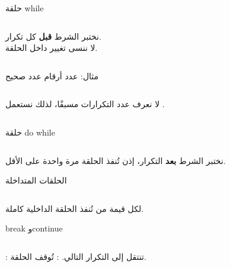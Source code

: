 \documentclass[aspectratio=169, 11pt, t, xcolor={table}]{beamer}
\begin{document}
\begin{frame}{حلقة \textenglish{while}}
    \begin{columns}[T]
        نختبر الشرط \textbf{قبل} كل تكرار.\\[4pt]
        لا ننسى تغيير  داخل الحلقة.
    \end{columns}
\end{frame}

\begin{frame}{مثال: عدد أرقام عدد صحيح}
    \begin{columns}[T]
        \vspace{0.3cm}
        لا نعرف عدد التكرارات مسبقًا، لذلك نستعمل .
    \end{columns}
\end{frame}

\begin{frame}{حلقة \textenglish{do while}}
    \begin{columns}[T]
    \end{columns}
    \vspace{0.3cm}
    نختبر الشرط \textbf{بعد} التكرار، إذن تُنفذ الحلقة مرة واحدة على الأقل.
\end{frame}

\begin{frame}{الحلقات المتداخلة}
    \begin{columns}[T]
    \end{columns}
    \vspace{0.2cm}
    لكل قيمة من  تُنفذ الحلقة الداخلية كاملة.
\end{frame}

\begin{frame}{\textenglish{break} و\textenglish{continue}}
    \begin{columns}[T]
    \end{columns}
    \vspace{0.3cm}
    : تنتقل إلى التكرار التالي. : تُوقف الحلقة.
\end{frame}
\end{document}
